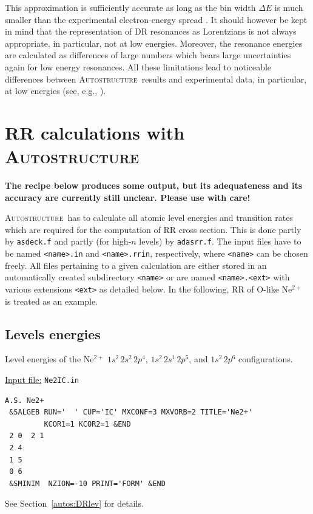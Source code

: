 \documentclass[a4paper,12pt]{article}
\newcommand{\autos}{\textsc{Autostructure}}
\begin{document}
This approximation is sufficiently accurate as long as the bin width $\Delta E$ is much smaller than the experimental electron-energy spread \cite{Badnell2006b}. It should however be kept in mind that the representation of DR resonances as Lorentzians is not always appropriate, in particular, not at low energies. Moreover, the resonance energies are calculated as differences of large numbers which bears large uncertainties again for low energy resonances. All these limitations lead to noticeable differences between \autos\ results and experimental data, in particular, at low energies (see, e.g., \citep{Hahn2014a,Huang2018,Lestinsky2012,Lestinsky2009,Schmidt2008a,Wang2018b}).

\section{RR calculations with \autos}

\textbf{The recipe below produces some output, but its adequateness and its accuracy are currently still unclear. Please use with care!}


\autos\ has to calculate all atomic level energies and transition rates which are required for the computation of RR cross section. This is done partly by \texttt{asdeck.f} and partly (for high-$n$ levels) by \texttt{adasrr.f}. The  input files have to be named \texttt{<name>.in} and \texttt{<name>.rrin}, respectively, where \texttt{<name>} can be chosen freely. All files pertaining to a given calculation are either stored in an automatically created subdirectory \texttt{<name>} or are named \texttt{<name>.<ext>} with various extensions \texttt{<ext>} as detailed below. In the following, RR of O-like Ne$^{2+}$ is treated as an example.

\subsection{Levels energies}\label{autos:RRlev}

Level energies of the Ne$^{2+}$ $1s^2\,2s^2\,2p^4$, $1s^2\,2s^1\,2p^5$, and $1s^2\,2p^6$ configurations.

\underline{Input file:} \texttt{Ne2IC.in}
\begin{verbatim}
A.S. Ne2+
 &SALGEB RUN='  ' CUP='IC' MXCONF=3 MXVORB=2 TITLE='Ne2+'
         KCOR1=1 KCOR2=1 &END
 2 0  2 1
 2 4
 1 5
 0 6
 &SMINIM  NZION=-10 PRINT='FORM' &END
\end{verbatim}
See Section~\ref{autos:DRlev} for details.
\end{document}
